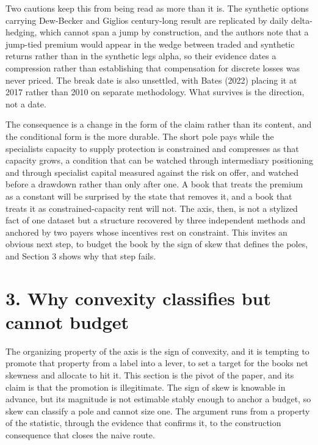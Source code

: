 \documentclass[12pt, a4paper]{article}
\begin{document}
Two cautions keep this from being read as more than it is. The synthetic
options carrying Dew-Becker and Giglio\textquotesingle s century-long
result are replicated by daily delta-hedging, which cannot span a jump
by construction, and the authors note that a jump-tied premium would
appear in the wedge between traded and synthetic returns rather than in
the synthetic leg\textquotesingle s alpha, so their evidence dates a
compression rather than establishing that compensation for discrete
losses was never priced. The break date is also unsettled, with Bates
(2022) placing it at 2017 rather than 2010 on separate methodology. What
survives is the direction, not a date.

The consequence is a change in the form of the claim rather than its
content, and the conditional form is the more durable. The short pole
pays while the specialists\textquotesingle{} capacity to supply
protection is constrained and compresses as that capacity grows, a
condition that can be watched through intermediary positioning and
through specialist capital measured against the risk on offer, and
watched before a drawdown rather than only after one. A book that treats
the premium as a constant will be surprised by the state that removes
it, and a book that treats it as constrained-capacity rent will not. The
axis, then, is not a stylized fact of one dataset but a structure
recovered by three independent methods and anchored by two payers whose
incentives rest on constraint. This invites an obvious next step, to
budget the book by the sign of skew that defines the poles, and Section
3 shows why that step fails.

\section*{3. Why convexity classifies but cannot
budget}\label{why-convexity-classifies-but-cannot-budget}

The organizing property of the axis is the sign of convexity, and it is
tempting to promote that property from a label into a lever, to set a
target for the book\textquotesingle s net skewness and allocate to hit
it. This section is the pivot of the paper, and its claim is that the
promotion is illegitimate. The sign of skew is knowable in advance, but
its magnitude is not estimable stably enough to anchor a budget, so skew
can classify a pole and cannot size one. The argument runs from a
property of the statistic, through the evidence that confirms it, to the
construction consequence that closes the naive route.
\end{document}
